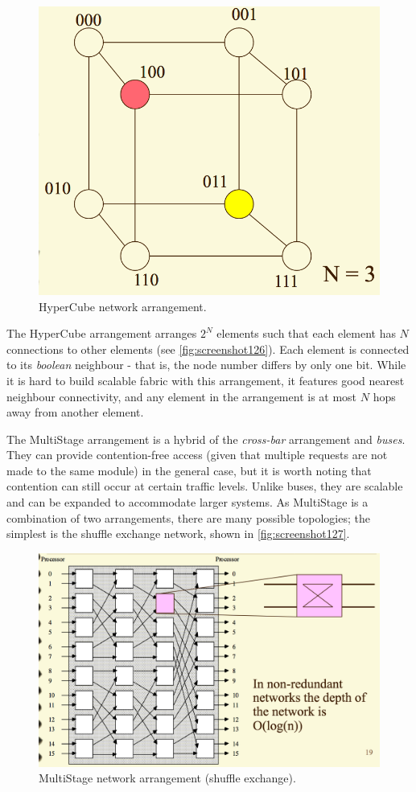 \begin{figure}
\centering
\includegraphics[width=0.7\linewidth]{screenshot126}
\caption{HyperCube network arrangement.}
\label{fig:screenshot126}
\end{figure}

The HyperCube arrangement arranges $2^N$ elements such that each element has $N$ connections to other elements (see \autoref{fig:screenshot126}). Each element is connected to its \textit{boolean} neighbour - that is, the node number differs by only one bit. While it is hard to build scalable fabric with this arrangement, it features good nearest neighbour connectivity, and any element in the arrangement is at most $N$ hops away from another element.

The MultiStage arrangement is a hybrid of the \textit{cross-bar} arrangement and \textit{buses}. They can provide contention-free access (given that multiple requests are not made to the same module) in the general case, but it is worth noting that contention can still occur at certain traffic levels. Unlike buses, they are scalable and can be expanded to accommodate larger systems. As MultiStage is a combination of two arrangements, there are many possible topologies; the simplest is the shuffle exchange network, shown in \autoref{fig:screenshot127}.

\begin{figure}
\centering
\includegraphics[width=0.7\linewidth]{screenshot127}
\caption{MultiStage network arrangement (shuffle exchange).}
\label{fig:screenshot127}
\end{figure}


